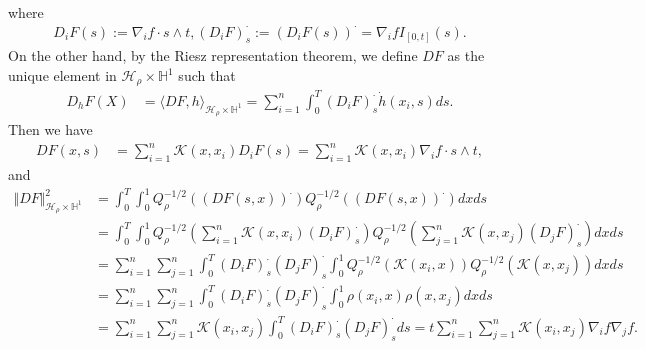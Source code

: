 \documentclass[11pt]{article}
\numberwithin{equation}{section}%
\numberwithin{figure}{section}%
\theoremstyle{remark}
\begin{document}
	where
	\begin{align*}
		D_{i}F(s):=\nabla_{i}f\cdot s\land t,(D_{i}F)_{s}^{\cdot}:=(	D_{i}F(s))^{\cdot}=\nabla_{i}fI_{[0,t]}(s).
	\end{align*}
	On the other hand, by the Riesz representation theorem, we define
	$DF$ as the unique element in $\mathcal{H}_{\rho}\times \mathbb{H}^{1}$ such that
	\begin{align*}
		D_{h}F(X)&=\langle DF,h \rangle_{\mathcal{H}_{\rho}\times \mathbb{H}^{1}}
		=\sum_{i=1}^{n}\int_{0}^{T}(D_{i}F)_{s}^{\cdot}\dot{h}(x_{i},s)ds.
	\end{align*}
	Then we have
	\begin{align*}
		DF(x,s)
		&=\sum_{i=1}^{n}\mathcal{K}(x,x_{i})D_{i}F(s)=\sum_{i=1}^{n}\mathcal{K}(x,x_{i})\nabla_{i}f\cdot s\land t,
	\end{align*}
	and
	\begin{align*}
		\Vert DF\Vert_{\mathcal{H}_{\rho}\times \mathbb{H}^{1}}^{2}
		&=\int_{0}^{T}\int_{0}^{1}Q^{-1/2}_{\rho} ((DF(s,x))^{\cdot})Q^{-1/2}_{\rho} ((DF(s,x))^{\cdot})dxds\\
		&=\int_{0}^{T}\int_{0}^{1}Q^{-1/2}_{\rho} (\sum_{i=1}^{n}\mathcal{K}(x,x_{i})(D_{i}F)_{s}^{\cdot})Q^{-1/2}_{\rho} (\sum_{j=1}^{n}\mathcal{K}(x,x_{j})(D_{j}F)_{s}^{\cdot})dxds\\
		&=\sum_{i=1}^{n}\sum_{j=1}^{n}\int_{0}^{T}(D_{i}F)_{s}^{\cdot}(D_{j}F)_{s}^{\cdot}\int_{0}^{1}Q^{-1/2}_{\rho} (\mathcal{K}(x_{i},x))Q^{-1/2}_{\rho} (\mathcal{K}(x,x_{j}))dxds\\
		&=\sum_{i=1}^{n}\sum_{j=1}^{n}\int_{0}^{T}(D_{i}F)_{s}^{\cdot}(D_{j}F)_{s}^{\cdot}\int_{0}^{1}\rho(x_{i},x)\rho(x,x_{j})dxds\\
		&=\sum_{i=1}^{n}\sum_{j=1}^{n}\mathcal{K}(x_{i},x_{j})\int_{0}^{T}(D_{i}F)_{s}^{\cdot}(D_{j}F)_{s}^{\cdot}ds=t\sum_{i=1}^{n}\sum_{j=1}^{n}\mathcal{K}(x_{i},x_{j})\nabla_{i}f\nabla_{j}f .
	\end{align*}
	
	
	
\end{document}

